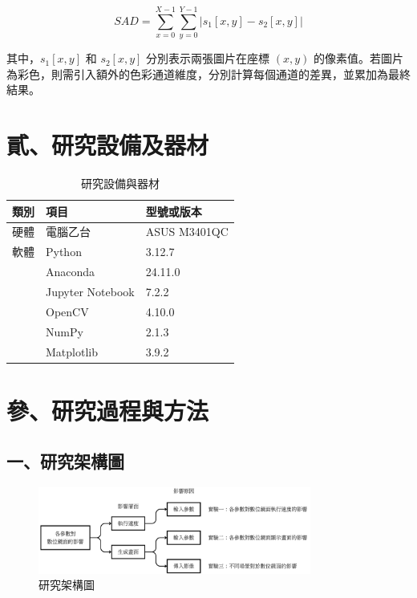 \documentclass[12pt]{article}
\begin{document}
\[
SAD = \sum_{x=0}^{X-1} \sum_{y=0}^{Y-1} \left| s_1[x, y] - s_2[x, y] \right|
\]

其中，$s_1[x, y]$ 和 $s_2[x, y]$ 分別表示兩張圖片在座標 $(x,y)$ 的像素值。若圖片為彩色，則需引入額外的色彩通道維度，分別計算每個通道的差異，並累加為最終結果。

\newpage

\section{貳、研究設備及器材}

\begin{table}[h]
  \centering
  \caption{研究設備與器材}
  \begin{tabular}{p{2cm}p{5cm}p{5cm}}
    \toprule
    類別 & 項目 & 型號或版本\\
    \midrule
    硬體 & 電腦乙台 & ASUS M3401QC\\
    軟體 & Python & 3.12.7 \\
        & Anaconda & 24.11.0 \\
        & Jupyter Notebook & 7.2.2 \\
        & OpenCV & 4.10.0 \\
        & NumPy & 2.1.3 \\
        & Matplotlib & 3.9.2 \\
    \bottomrule
  \end{tabular}
\end{table}

\newpage

\section{參、研究過程與方法}

\subsection{一、研究架構圖}

\begin{figure}[htbp]
  \centering
  \includegraphics[width=0.8\textwidth]{img//research_flaw.png}
  \caption{研究架構圖}
\end{figure}
\end{document}
